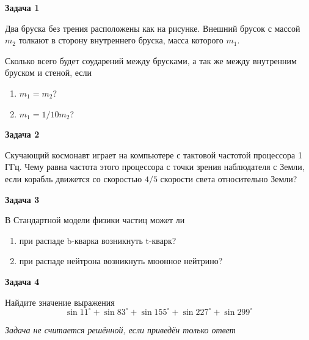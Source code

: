 \maketitle
\par{\bf Задача 1}\par
Два бруска без трения расположены как на рисунке. Внешний брусок с массой
$m_2$ толкают в
сторону внутреннего бруска, масса которого $m_1$.
\begin{figure}[h!]
    \begin{centering}
    \end{centering}
\end{figure}
Сколько всего будет соударений между брусками, а так
же между внутренним бруском и стеной, если
\begin{enumerate}
    \item $m_1 = m_2$?
    \item $m_1 = 1/10 m_2$?
\end{enumerate}

\par{\bf Задача 2}\par
Скучающий космонавт играет на компьютере с тактовой частотой процессора 1
ГГц.  Чему равна частота этого процессора с точки зрения наблюдателя с
Земли, если корабль движется со скоростью $4/5$ скорости света относительно
Земли?
\par{\bf Задача 3}\par
В Стандартной модели физики частиц может ли
\begin{enumerate}
    \item при распаде $\text{b}$-кварка возникнуть $\text{t}$-кварк?
    \item при распаде нейтрона возникнуть мюонное нейтрино?
\end{enumerate}
\par{\bf Задача 4}\par
Найдите значение выражения
\begin{equation*}
\sin 11^\circ + \sin 83^\circ + \sin 155^\circ + \sin 227^\circ +
    \sin 299^\circ
\end{equation*}

\begin{centering}
    {\it
    Задача не считается решённой, если приведён только ответ
    }
\end{centering}
